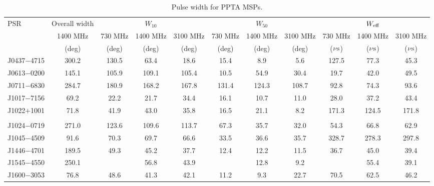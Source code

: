 \documentclass[useAMS,usenatbib]{mn2e}
\begin{document}
\begin{table}
\begin{center}
\caption{Pulse width for PPTA MSPs.}
\label{tableWidth}
\begin{tabular}{lcccccccccc}
\hline
PSR              &     Overall width     &               &   $W_{10}$       &                  &      &      $W_{50}$       &            &                       &  $W_{\rm{eff}}$    &      \\
								 &      1400 MHz         &  730 MHz      &          1400 MHz           &    3100 MHz      &  730 MHz      &          1400 MHz           &    3100 MHz    &  730 MHz      &          1400 MHz           &    3100 MHz       \\
								 &        (deg)          &    (deg)   &         (deg)          &     (deg)   &   (deg)   &         (deg)          &     (deg)  &   ($\rm{\nu s}$)   &         ($\rm{\nu s}$)          &     ($\rm{\nu s}$)  \\
\hline
J0437$-$4715     &  300.2      & 130.5     & 63.4   & 18.6   & 15.4  & 8.9   & 5.6     &  127.5  &  77.3  & 45.3   \\
J0613$-$0200     &  145.1      & 105.9     & 109.1  & 105.4  & 10.5  & 54.9  & 30.4    &  19.7   &  42.0  & 49.5    \\
J0711$-$6830     &  284.7      & 180.9     & 168.2  & 167.8  & 131.4  & 124.3  & 108.7 &  92.8   &  74.3  & 93.6       \\
J1017$-$7156     &  69.2       & 22.2      & 21.7   & 34.4   & 16.1  & 10.7  & 11.0    &  28.0   &  37.2  & 43.4    \\
J1022$+$1001     &  71.8       & 41.9      & 43.0   & 35.8   & 16.5  & 21.1  & 8.2     &  171.3  &  124.5 & 171.8  \\
	               &        &      &   &   &   &   &              \\                                                
J1024$-$0719     &  271.0      & 123.6     & 109.6  & 113.7  & 67.3  & 35.7  & 32.0    &  54.3   &  66.8  & 62.9       \\
J1045$-$4509     &  91.6       & 70.3      & 69.7   & 66.6   & 33.5  & 36.6  & 35.7    &  328.7  &  278.3 & 297.8      \\
J1446$-$4701     &  189.5      & 49.3      & 45.2   & 37.7   & 12.4  & 12.2  & 11.5    &  36.7   &  45.0  & 39.4  \\
J1545$-$4550     &  250.1      &           & 56.8   & 43.9   &       & 12.8  & 9.2     &         &  55.4  & 39.1  \\
J1600$-$3053     &  76.8       & 48.6      & 41.3   & 42.1   & 11.2  & 9.3   & 22.7    &  70.5   &  62.5  & 46.2       \\

\end{tabular}
\end{center}
\end{table}
\end{document}
